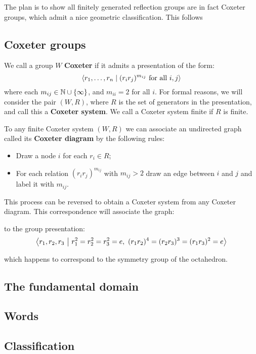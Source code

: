 \documentclass[../main.tex]{subfiles}
\begin{document}
The plan is to show all finitely generated reflection groups are in fact Coxeter groups, which admit a nice geometric classification. This follows\cite{Humphreys1990}

\subsection{Coxeter groups}

\begin{definition}
    We call a group $W$ \textbf{Coxeter} if it admits a presentation of the form:\[
    \left\langle r_1,\ldots,r_n \mid (r_ir_j)^{m_{ij}}\text{ for all }i,j \right\rangle
    \]
    where each $m_{ij}\in \mathbb{N}\cup\{\infty\}$, and $m_{ii}=2$ for all $i$. For formal reasons, we will consider the pair $(W,R)$, where $R$ is the set of generators in the presentation, and call this a \textbf{Coxeter system}. We call a Coxeter system finite if $R$ is finite.
\end{definition}

To any finite Coxeter system $(W,R)$ we can associate an undirected graph called its \textbf{Coxeter diagram} by the following rules:\begin{itemize}
    \item Draw a node $i$ for each $r_i\in R$;
    \item For each relation $(r_i r_j)^{m_{ij}}$ with $m_{ij}>2$ draw an edge between $i$ and $j$ and label it with $m_{ij}$.
\end{itemize}

This process can be reversed to obtain a Coxeter system from any Coxeter diagram. This correspondence will associate the graph:
\begin{figure}[!h]
\centering
{}
\end{figure}

to the group presentation: \[
\left\langle r_1,r_2,r_3 \ \middle| \ r_1^2 = r_2^2 = r_3^2 = e, \ (r_1r_2)^4 = (r_2r_3)^3 = (r_1r_3)^2 = e \right\rangle
\]

which happens to correspond to the symmetry group of the octahedron.


\subsection{The fundamental domain}

\subsection{Words}

\subsection{Classification}
\end{document}
